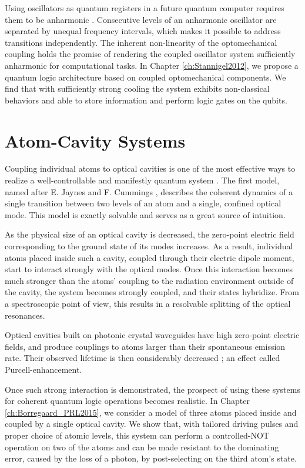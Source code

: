 Using oscillators as quantum registers in a future quantum computer requires
them to be anharmonic \cite{Majer2007}. Consecutive levels of an
anharmonic oscillator are separated by unequal frequency intervals, which makes
it possible to address transitions independently. The inherent
non-linearity of the optomechanical coupling holds the promise of rendering the
coupled oscillator system sufficiently anharmonic for computational tasks. In
Chapter \ref{ch:Stannigel2012}, we propose a quantum logic architecture based on
coupled optomechanical components. We find that with sufficiently strong cooling
the system exhibits non-classical behaviors and able to store information and
perform logic gates on the qubits.






\section{Atom-Cavity Systems}
Coupling individual atoms to optical cavities is one of the most effective ways
to realize a well-controllable and manifestly quantum system \cite{Mabuchi2002,
Walther2006}.
The first model, named after E. Jaynes and F. Cummings \cite{Jaynes1963,
Shore1993}, describes the coherent dynamics of a single transition between two
levels of an atom and a single, confined optical mode. This model is exactly
solvable and serves as a great source of intuition.

As the physical size of an optical cavity is decreased, the zero-point
electric field corresponding to the ground state of its modes increases.
As a result, individual atoms placed inside such a cavity, coupled through their
electric dipole moment, start to interact strongly with the optical modes. Once
this interaction becomes much stronger than the atoms' coupling to the radiation
environment outside of the cavity, the system becomes strongly coupled, and
their states hybridize. From a spectroscopic point of view, this results in a
resolvable splitting of the optical resonances.

Optical cavities built on photonic crystal waveguides \cite{Tiecke} have
high zero-point electric fields, and produce couplings
to atoms larger than their spontaneous emission rate. Their
observed lifetime is then considerably decreased \cite{Englund2005}; an effect
called Purcell-enhancement.

Once such strong interaction is demonstrated, the prospect of using these
systems for coherent quantum logic operations becomes realistic. In Chapter
\ref{ch:Borregaard_PRL2015}, we consider a model of three atoms placed inside
and coupled by a single optical cavity. We show that, with tailored driving pulses
and proper choice of atomic levels, this system can perform a controlled-NOT
operation on two of the atoms and can be made resistant to the dominating error,
caused by the loss of a photon, by post-selecting on the third atom's
state.

